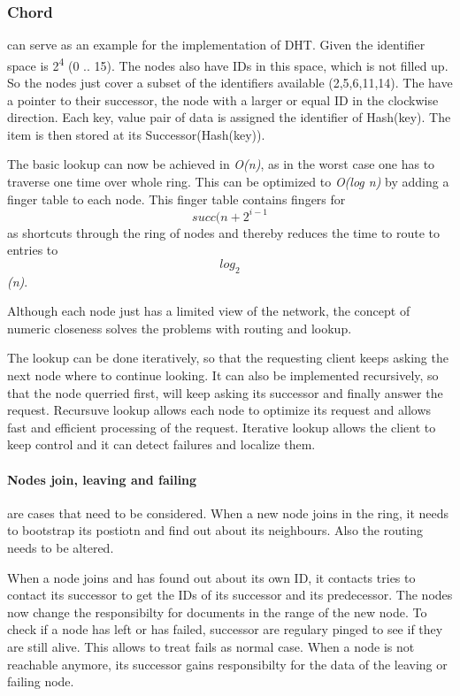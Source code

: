 \subsubsection{Chord} %
\label{ssub:chord}
	can serve as an example for the implementation of DHT.
	Given the identifier space is 2\textsuperscript{4} (0 .. 15).
	The nodes also have IDs in this space,
	which is not filled up.
	So the nodes just cover a subset of the identifiers available (2,5,6,11,14).
	The have a pointer to their successor,
	the node with a larger or equal ID in the clockwise direction.
	Each key, value pair of data is assigned the identifier of Hash(key).
	The item is then stored at its Successor(Hash(key)).

	The basic lookup can now be achieved in \textit{O(n)},
	as in the worst case one has to traverse one time over whole ring.
	This can be optimized to \textit{O(log n)} by adding a finger table to each node.
	This finger table contains fingers for $$succ(n+2^{i-1}$$ as shortcuts through the ring of nodes
	and thereby reduces the time to route to entries to \textit{$$log_2$$(n)}.

	Although each node just has a limited view of the network,
	the concept of numeric closeness solves the problems with routing and lookup.
	
	The lookup can be done iteratively,
	so that the requesting client keeps asking the next node where to continue looking.
	It can also be implemented recursively,
	so that the node querried first,
	will keep asking its successor and finally answer the request.
	Recursuve lookup allows each node to optimize its request
	and allows fast and efficient processing of the request.
	Iterative lookup allows the client to keep control
	and it can detect failures and localize them.

	\paragraph{Nodes join, leaving and failing} %
	\label{par:nodes_join_leaving_and_failing}
	are cases that need to be considered.
	When a new node joins in the ring,
	it needs to bootstrap its postiotn and find out about its neighbours.
	Also the routing needs to be altered.

	When a node joins and has found out about its own ID,
	it contacts tries to contact its successor to get the IDs of its successor and its predecessor.
	The nodes now change the responsibilty for documents in the range of the new node.
	To check if a node has left or has failed,
	successor are regulary pinged to see if they are still alive.
	This allows to treat fails as normal case.
	When a node is not reachable anymore,
	its successor gains responsibilty for the data of the leaving or failing node.

